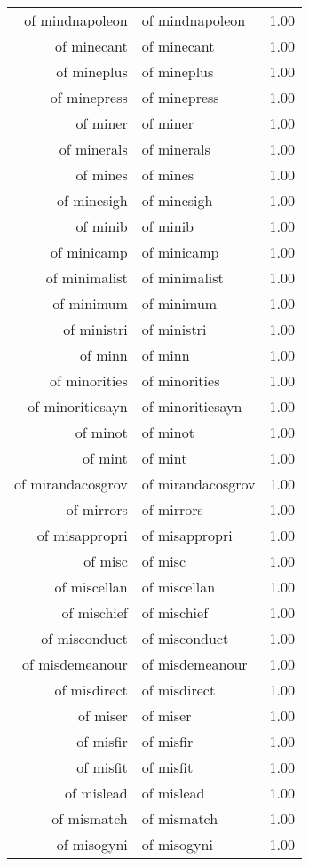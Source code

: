 \begin{table}[ht]
\begin{tabular}{rlr}
  of mindnapoleon & of mindnapoleon & 1.00 \\ 
  of minecant & of minecant & 1.00 \\ 
  of mineplus & of mineplus & 1.00 \\ 
  of minepress & of minepress & 1.00 \\ 
  of miner & of miner & 1.00 \\ 
  of minerals & of minerals & 1.00 \\ 
  of mines & of mines & 1.00 \\ 
  of minesigh & of minesigh & 1.00 \\ 
  of minib & of minib & 1.00 \\ 
  of minicamp & of minicamp & 1.00 \\ 
  of minimalist & of minimalist & 1.00 \\ 
  of minimum & of minimum & 1.00 \\ 
  of ministri & of ministri & 1.00 \\ 
  of minn & of minn & 1.00 \\ 
  of minorities & of minorities & 1.00 \\ 
  of minoritiesayn & of minoritiesayn & 1.00 \\ 
  of minot & of minot & 1.00 \\ 
  of mint & of mint & 1.00 \\ 
  of mirandacosgrov & of mirandacosgrov & 1.00 \\ 
  of mirrors & of mirrors & 1.00 \\ 
  of misappropri & of misappropri & 1.00 \\ 
  of misc & of misc & 1.00 \\ 
  of miscellan & of miscellan & 1.00 \\ 
  of mischief & of mischief & 1.00 \\ 
  of misconduct & of misconduct & 1.00 \\ 
  of misdemeanour & of misdemeanour & 1.00 \\ 
  of misdirect & of misdirect & 1.00 \\ 
  of miser & of miser & 1.00 \\ 
  of misfir & of misfir & 1.00 \\ 
  of misfit & of misfit & 1.00 \\ 
  of mislead & of mislead & 1.00 \\ 
  of mismatch & of mismatch & 1.00 \\ 
  of misogyni & of misogyni & 1.00 \\ 

\end{tabular}
\end{table}
